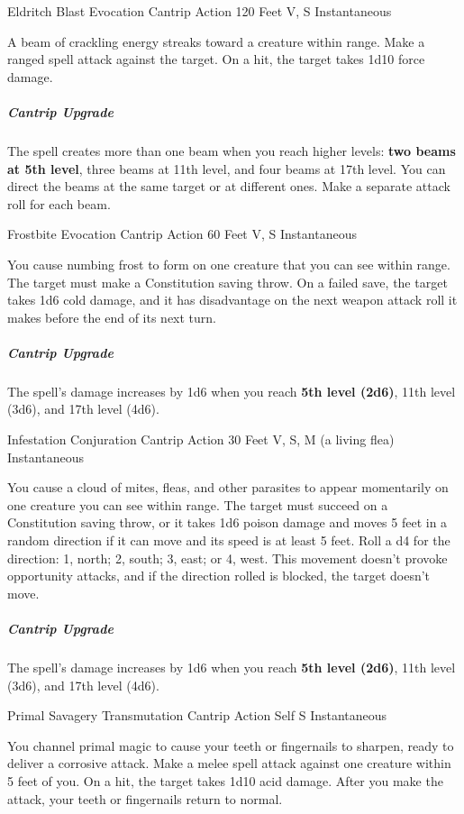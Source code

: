 \documentclass[letterpaper,openany,oneside,twocolumn]{book}
\begin{document}
\DndSpellHeader
  {Eldritch Blast}
  {Evocation Cantrip}
  {Action}
  {120 Feet}
  {V, S}
  {Instantaneous}

A beam of crackling energy streaks toward a creature within range. Make a ranged spell attack against the target. On a hit, the target takes 1d10 force damage.

\subparagraph*{Cantrip Upgrade} The spell creates more than one beam when you reach higher levels: \textbf{two beams at 5th level}, three beams at 11th level, and four beams at 17th level. You can direct the beams at the same target or at different ones. Make a separate attack roll for each beam.

\DndSpellHeader
  {Frostbite}
  {Evocation Cantrip}
  {Action}
  {60 Feet}
  {V, S}
  {Instantaneous}

You cause numbing frost to form on one creature that you can see within range. The target must make a Constitution saving throw. On a failed save, the target takes 1d6 cold damage, and it has disadvantage on the next weapon attack roll it makes before the end of its next turn.

\subparagraph*{Cantrip Upgrade} The spell's damage increases by 1d6 when you reach \textbf{5th level (2d6)}, 11th level (3d6), and 17th level (4d6).

\DndSpellHeader
  {Infestation}
  {Conjuration Cantrip}
  {Action}
  {30 Feet}
  {V, S, M (a living flea)}
  {Instantaneous}

You cause a cloud of mites, fleas, and other parasites to appear momentarily on one creature you can see within range. The target must succeed on a Constitution saving throw, or it takes 1d6 poison damage and moves 5 feet in a random direction if it can move and its speed is at least 5 feet. Roll a d4 for the direction: 1, north; 2, south; 3, east; or 4, west. This movement doesn't provoke opportunity attacks, and if the direction rolled is blocked, the target doesn't move.

\subparagraph*{Cantrip Upgrade} The spell's damage increases by 1d6 when you reach \textbf{5th level (2d6)}, 11th level (3d6), and 17th level (4d6).

\DndSpellHeader
  {Primal Savagery}
  {Transmutation Cantrip}
  {Action}
  {Self}
  {S}
  {Instantaneous}

You channel primal magic to cause your teeth or fingernails to sharpen, ready to deliver a corrosive attack. Make a melee spell attack against one creature within 5 feet of you. On a hit, the target takes 1d10 acid damage. After you make the attack, your teeth or fingernails return to normal.
\end{document}
